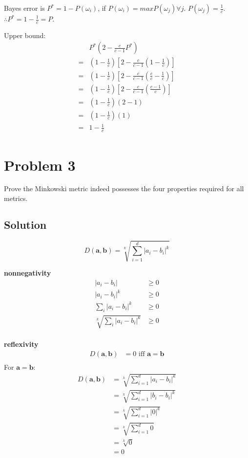 \documentclass{IEEEtran}
\begin{document}
Bayes error is \(P^* = 1 - P(\omega_i)\), if \(P(\omega_i) = max P(\omega_j) \forall j\).
\(P(\omega_j) = \frac{1}{c}\). \(\therefore P^* = 1 - \frac{1}{c} = P\).

Upper bound:
\begin{align*}
    & P^* \left( 2 - \frac{c}{c - 1} P^*\right) \\
    = &\left( 1 - \frac{1}{c} \right) \left[ 2 - \frac{c}{c - 1} \left( 1 - \frac{1}{c} \right) \right] \\
    = &\left( 1 - \frac{1}{c} \right) \left[ 2 - \frac{c}{c - 1} \left( \frac{c}{c} - \frac{1}{c} \right) \right] \\
    = &\left( 1 - \frac{1}{c} \right) \left[ 2 - \frac{c}{c - 1} \left( \frac{c - 1}{c} \right) \right] \\
    = &\left( 1 - \frac{1}{c} \right) (2 - 1) \\
    = &\left( 1 - \frac{1}{c} \right) (1) \\
    = &1 - \frac{1}{c} \\
\end{align*}

\newpage

\section{Problem 3} %
Prove the Minkowski metric indeed possesses the four properties required for all metrics.

\subsection{Solution}
\[D(\mathbf{a}, \mathbf{b}) = \sqrt[k]{\sum_{i=1}^d\left|a_i - b_i\right|^k}\]

\textbf{nonnegativity} %
\begin{align*}
    \left|a_i - b_i\right| &\ge 0 \\
    \left|a_i - b_i\right|^k & \ge 0 \\
    \sum_i \left|a_i - b_i\right|^k & \ge 0 \\
    \sqrt[k]{\sum_i \left|a_i - b_i\right|^k} & \ge 0 \\
\end{align*}

\textbf{reflexivity} %
\begin{align*}
    D(\mathbf{a}, \mathbf{b}) &= 0 \text{ iff } \mathbf{a} = \mathbf{b} \\
\end{align*}
For \(\mathbf{a} = \mathbf{b}\):
\begin{align*}
    D(\mathbf{a}, \mathbf{b}) &= \sqrt[k]{\sum_{i=1}^d\left|a_i - b_i\right|^k} \\
    &= \sqrt[k]{\sum_{i=1}^d\left|b_i - b_i\right|^k} \\
    &= \sqrt[k]{\sum_{i=1}^d|0|^k} \\
    &= \sqrt[k]{\sum_{i=1}^d0} \\
    &= \sqrt[k]{0} \\
    &= 0
\end{align*}
\end{document}
